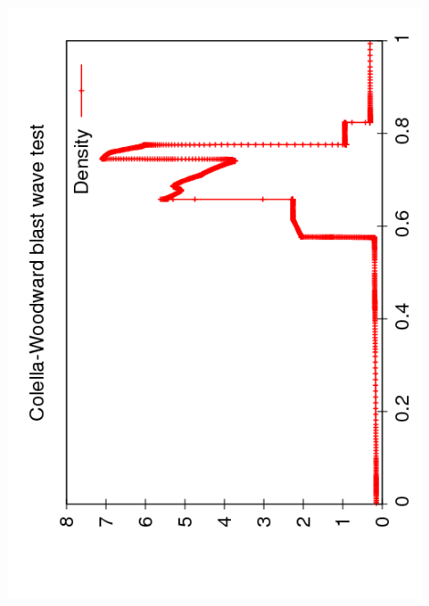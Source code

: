 \documentclass{beamer}
\begin{document}
\begin{frame}
\begin{columns}
\begin{column}{0.5\textwidth}
\begin{overlayarea}{\textwidth}{0.9\textheight}
{          \includegraphics[angle=-90,width=0.9\textwidth]{figures/AMR_Density_300}\\
}
\end{overlayarea}
\end{column}
\end{columns}
\end{frame}
\end{document}
